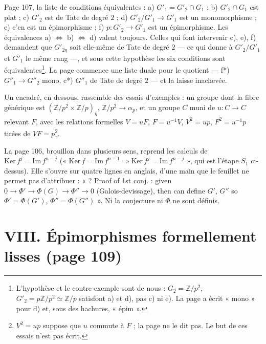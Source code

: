 \documentclass[11pt,a4paper]{article}
\begin{document}
Page 107, la liste de conditions équivalentes : a) $G'_1 = G'_2 \cap G_1$ ;
b) $G'_2 \cap G_1$ est plat ; c) $G'_2$ est de Tate de degré $2$ ; d)
$G'_2/G'_1 \to G'_1$ est un monomorphisme ; e) c'en est un épimorphisme ;
f) $p \colon G'_2 \to G'_1$ est un épimorphisme. Les équivalences a)
$\Leftrightarrow$ b) $\Leftrightarrow$ d) valent toujours. Celles qui
font intervenir c), e), f) demandent que $G'_{2\eta}$ soit elle-même de
Tate de degré $2$ — ce qui donne à $G'_2/G'_1$ et $G'_1$ le même rang —,
et sous cette hypothèse les six conditions sont
équivalentes\footnote{L'hypothèse et le contre-exemple sont de nous :
$G_2 = \mathbb{Z}/p^{2}$, $G'_2 = p\mathbb{Z}/p^{2} \simeq \mathbb{Z}/p$
satisfont a) et d), pas c) ni e). La page a écrit « mono » pour d) et,
sous des hachures, « épim ».}. La page commence une liste duale pour le
quotient — f*) $G''_1 \to G''_2$ mono, c*) $G''_1$ de Tate de degré $2$ —
et la laisse inachevée.

Un encadré, en dessous, rassemble des essais d'exemples : un groupe dont
la fibre générique est $(\mathbb{Z}/p^{2} \times \mathbb{Z}/p)_\eta$,
$\mathbb{Z}/p^{2} \to \alpha_p$, et un groupe $C$ muni de $u \colon C \to
C$ relevant $F$, avec les relations formelles $V = uF$, $F = u^{-1}V$,
$V^{2} = up$, $F^{2} = u^{-1}p$ tirées de $VF = p$\footnote{$V^{2} = up$
suppose que $u$ commute à $F$ ; la page ne le dit pas. Le but de ces
essais n'est pas écrit.}.

La page 106, brouillon dans plusieurs sens, reprend les calculs de
$\mathrm{Ker}\, f^{j} = \mathrm{Im}\, f^{n-j}$ (« $\mathrm{Ker}\, f =
\mathrm{Im}\, f^{n-1} \Rightarrow \mathrm{Ker}\, f^{j} = \mathrm{Im}\,
f^{n-j}$ », qui est l'étape $S_1$ ci-dessus). Elle s'ouvre sur quatre
lignes en anglais, d'une main que le feuillet ne permet pas d'attribuer :
« ? Proof of 1st conj. : given $0 \to \Phi' \to \Phi(G) \to \Phi'' \to
0$ (Galois-devissage), then can define $G'$, $G''$ so $\Phi' =
\Phi(G')$, $\Phi'' = \Phi(G'')$ ». Ni la conjecture ni $\Phi$ ne sont
définis.

\section*{VIII. Épimorphismes formellement lisses (page 109)}
\end{document}
